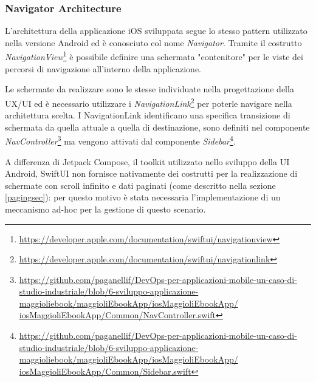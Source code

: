 \subsubsection*{Navigator Architecture}
L'architettura della applicazione iOS sviluppata segue lo stesso pattern utilizzato nella versione Android ed è conosciuto col nome \textit{Navigator}. Tramite il costrutto \textit{NavigationView}\footnote{\href{https://developer.apple.com/documentation/swiftui/navigationview}{https://developer.apple.com/documentation/swiftui/navigationview}} è possibile definire una schermata "contenitore" per le viste dei percorsi di navigazione all'interno della applicazione.

Le schermate da realizzare sono le stesse individuate nella progettazione della UX/UI ed è necessario utilizzare i \textit{NavigationLink}\footnote{\href{https://developer.apple.com/documentation/swiftui/navigationlink}{https://developer.apple.com/documentation/swiftui/navigationlink}} per poterle navigare nella architettura scelta. I NavigationLink identificano una specifica transizione di schermata da quella attuale a quella di destinazione, sono definiti nel componente \textit{NavController}\footnote{\href{https://github.com/paganellif/DevOps-per-applicazioni-mobile-un-caso-di-studio-industriale/blob/6-sviluppo-applicazione-maggioliebook/maggioliEbookApp/iosMaggioliEbookApp/iosMaggioliEbookApp/Common/NavController.swift}{https://github.com/paganellif/DevOps-per-applicazioni-mobile-un-caso-di-studio-industriale/blob/6-sviluppo-applicazione-maggioliebook/maggioliEbookApp/iosMaggioliEbookApp/\\iosMaggioliEbookApp/Common/NavController.swift}} ma vengono attivati dal componente \textit{Sidebar}\footnote{\href{https://github.com/paganellif/DevOps-per-applicazioni-mobile-un-caso-di-studio-industriale/blob/6-sviluppo-applicazione-maggioliebook/maggioliEbookApp/iosMaggioliEbookApp/iosMaggioliEbookApp/Common/Sidebar.swift}{https://github.com/paganellif/DevOps-per-applicazioni-mobile-un-caso-di-studio-industriale/blob/6-sviluppo-applicazione-maggioliebook/maggioliEbookApp/iosMaggioliEbookApp/\\iosMaggioliEbookApp/Common/Sidebar.swift}}.

A differenza di Jetpack Compose, il toolkit utilizzato nello sviluppo della UI Android, SwiftUI non fornisce nativamente dei costrutti per la realizzazione di schermate con scroll infinito e dati paginati (come descritto nella sezione \ref{pagingsec}): per questo motivo è stata necessaria l'implementazione di un meccanismo ad-hoc per la gestione di questo scenario.

